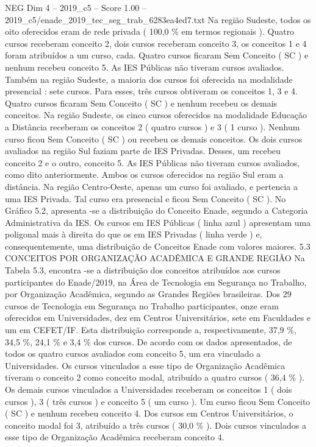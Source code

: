 \begin{textsample}{NEG Dim 4 – 2019\_c5 – Score 1.00 – 2019\_c5/enade\_2019\_tec\_seg\_trab\_6283ea4ed7.txt}
Na região Sudeste, todos os oito oferecidos eram de rede privada ( 100,0 \% em termos regionais ).
Quatro cursos receberam conceito 2, dois cursos receberam conceito 3, os conceitos 1 e 4 foram atribuídos a um curso, cada.
Quatro cursos ficaram Sem Conceito ( SC ) e nenhum recebeu conceito 5.
As IES Públicas não tiveram cursos avaliados.
Também na região Sudeste, a maioria dos cursos foi oferecida na modalidade presencial : sete cursos.
Para esses, três cursos obtiveram os conceitos 1, 3 e 4.
Quatro cursos ficaram Sem Conceito ( SC ) e nenhum recebeu os demais conceitos.
Na região Sudeste, os cinco cursos oferecidos na modalidade Educação a Distância receberam os conceitos 2 ( quatro cursos ) e 3 ( 1 curso ).
Nenhum curso ficou Sem Conceito ( SC ) ou recebeu os demais conceitos.
Os dois cursos avaliados na região Sul faziam parte de IES Privadas.
Desses, um recebeu conceito 2 e o outro, conceito 5.
As IES Públicas não tiveram cursos avaliados, como dito anteriormente.
Ambos os cursos oferecidos na região Sul eram a distância.
Na região Centro-Oeste, apenas um curso foi avaliado, e pertencia a uma IES Privada.
Tal curso era presencial e ficou Sem Conceito ( SC ).
No Gráfico 5.2, apresenta -se a distribuição do Conceito Enade, segundo a Categoria Administrativa da IES.
Os cursos em IES Públicas ( linha azul ) apresentam uma poligonal mais à direita do que os em IES Privadas ( linha verde ) e, consequentemente, uma distribuição de Conceitos Enade com valores maiores. 5.3 CONCEITOS POR ORGANIZAÇÃO ACADÊMICA E GRANDE REGIÃO Na Tabela 5.3, encontra -se a distribuição dos conceitos atribuídos aos cursos participantes do Enade/2019, na Área de Tecnologia em Segurança no Trabalho, por Organização Acadêmica, segundo as Grandes Regiões brasileiras.
Dos 29 cursos de Tecnologia em Segurança no Trabalho participantes, onze eram oferecidos em Universidades, dez em Centros Universitários, sete em Faculdades e um em CEFET/IF.
Esta distribuição corresponde a, respectivamente, 37,9 \%, 34,5 \%, 24,1 \% e 3,4 \% dos cursos.
De acordo com os dados apresentados, de todos os quatro cursos avaliados com conceito 5, um era vinculado a Universidades.
Os cursos vinculados a esse tipo de Organização Acadêmica tiveram o conceito 2 como conceito modal, atribuído a quatro cursos ( 36,4 \% ).
Os demais cursos vinculados a Universidades receberam os conceitos 1 ( dois cursos ), 3 ( três cursos ) e conceito 5 ( um curso ).
Um curso ficou Sem Conceito ( SC ) e nenhum recebeu conceito 4.
Dos cursos em Centros Universitários, o conceito modal foi 3, atribuído a três cursos ( 30,0 \% ).
Dois cursos vinculados a esse tipo de Organização Acadêmica receberam conceito 4.

\end{textsample}
